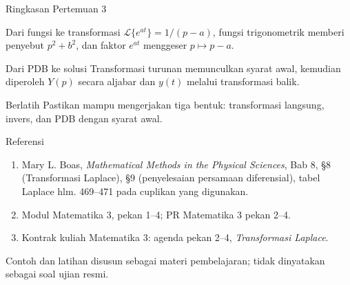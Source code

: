 \documentclass[aspectratio=169,11pt]{beamer}
\newcommand{\Lap}{\mathcal{L}}
\begin{document}
\begin{frame}{Ringkasan Pertemuan 3}
\begin{block}{Dari fungsi ke transformasi}
$\Lap\{e^{at}\}=1/(p-a)$, fungsi trigonometrik memberi penyebut $p^2+b^2$, dan faktor $e^{at}$ menggeser $p\mapsto p-a$.
\end{block}
\begin{block}{Dari PDB ke solusi}
Transformasi turunan memunculkan syarat awal, kemudian diperoleh $Y(p)$ secara aljabar dan $y(t)$ melalui transformasi balik.
\end{block}
\begin{alertblock}{Berlatih}
Pastikan mampu mengerjakan tiga bentuk: transformasi langsung, invers, dan PDB dengan syarat awal.
\end{alertblock}
\end{frame}

\begin{frame}{Referensi}
\small
\begin{enumerate}
\item Mary L. Boas, \textit{Mathematical Methods in the Physical Sciences}, Bab 8, \S8 (Transformasi Laplace), \S9 (penyelesaian persamaan diferensial), tabel Laplace hlm. 469--471 pada cuplikan yang digunakan.
\item Modul Matematika 3, pekan 1--4; PR Matematika 3 pekan 2--4.
\item Kontrak kuliah Matematika 3: agenda pekan 2--4, \textit{Transformasi Laplace}.
\end{enumerate}
\vfill
\footnotesize Contoh dan latihan disusun sebagai materi pembelajaran; tidak dinyatakan sebagai soal ujian resmi.
\end{frame}
\end{document}
